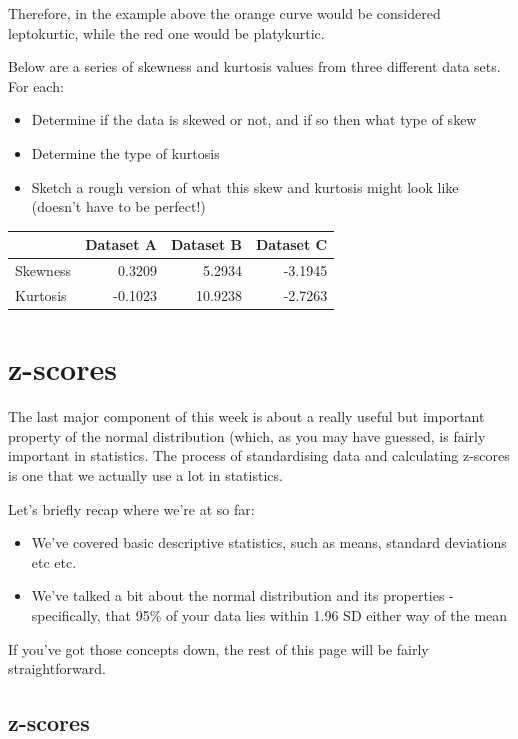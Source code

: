\documentclass[
]{book}
\providecommand{\tightlist}{%
  \setlength{\itemsep}{0pt}\setlength{\parskip}{0pt}}
\begin{document}
Therefore, in the example above the orange curve would be considered leptokurtic, while the red one would be platykurtic.

Below are a series of skewness and kurtosis values from three different data sets. For each:

\begin{itemize}
\tightlist
\item
  Determine if the data is skewed or not, and if so then what type of skew
\item
  Determine the type of kurtosis
\item
  Sketch a rough version of what this skew and kurtosis might look like (doesn't have to be perfect!)
\end{itemize}

\begin{tabular}{l|r|r|r}
\hline
 & Dataset A & Dataset B & Dataset C\\
\hline
Skewness & 0.3209 & 5.2934 & -3.1945\\
\hline
Kurtosis & -0.1023 & 10.9238 & -2.7263\\
\hline
\end{tabular}

\section{z-scores}\label{zscores}

The last major component of this week is about a really useful but important property of the normal distribution (which, as you may have guessed, is fairly important in statistics. The process of standardising data and calculating z-scores is one that we actually use a lot in statistics.

\newline

Let's briefly recap where we're at so far:

\begin{itemize}
\tightlist
\item
  We've covered basic descriptive statistics, such as means, standard deviations etc etc.
\item
  We've talked a bit about the normal distribution and its properties - specifically, that 95\% of your data lies within 1.96 SD either way of the mean
\end{itemize}

If you've got those concepts down, the rest of this page will be fairly straightforward.

\subsection{z-scores}\label{z-scores}
\end{document}
